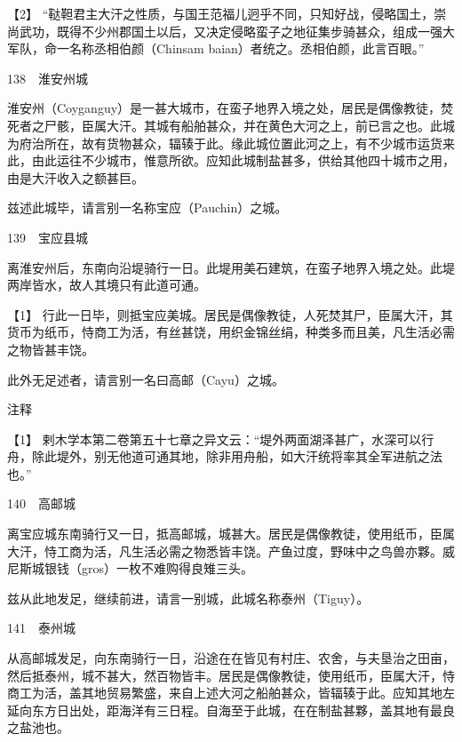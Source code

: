 \documentclass[12pt,UTF8]{ctexbook}
\begin{document}
【2】 “鞑靼君主大汗之性质，与国王范福儿迥乎不同，只知好战，侵略国土，崇尚武功，既得不少州郡国土以后，又决定侵略蛮子之地征集步骑甚众，组成一强大军队，命一名称丞相伯颜（Chinsam baian）者统之。丞相伯颜，此言百眼。”





138　淮安州城

淮安州（Coyganguy）是一甚大城市，在蛮子地界入境之处，居民是偶像教徒，焚死者之尸骸，臣属大汗。其城有船舶甚众，并在黄色大河之上，前已言之也。此城为府治所在，故有货物甚众，辐辏于此。缘此城位置此河之上，有不少城市运货来此，由此运往不少城市，惟意所欲。应知此城制盐甚多，供给其他四十城市之用，由是大汗收入之额甚巨。

兹述此城毕，请言别一名称宝应（Pauchin）之城。





139　宝应县城

离淮安州后，东南向沿堤骑行一日。此堤用美石建筑，在蛮子地界入境之处。此堤两岸皆水，故人其境只有此道可通。





【1】 行此一日毕，则抵宝应美城。居民是偶像教徒，人死焚其尸，臣属大汗，其货币为纸币，恃商工为活，有丝甚饶，用织金锦丝绢，种类多而且美，凡生活必需之物皆甚丰饶。

此外无足述者，请言别一名曰高邮（Cayu）之城。

注释

【1】 剌木学本第二卷第五十七章之异文云：“堤外两面湖泽甚广，水深可以行舟，除此堤外，别无他道可通其地，除非用舟船，如大汗统将率其全军进航之法也。”





140　高邮城

离宝应城东南骑行又一日，抵高邮城，城甚大。居民是偶像教徒，使用纸币，臣属大汗，恃工商为活，凡生活必需之物悉皆丰饶。产鱼过度，野味中之鸟兽亦夥。威尼斯城银钱（gros）一枚不难购得良雉三头。

兹从此地发足，继续前进，请言一别城，此城名称泰州（Tiguy）。





141　泰州城

从高邮城发足，向东南骑行一日，沿途在在皆见有村庄、农舍，与夫垦治之田亩，然后抵泰州，城不甚大，然百物皆丰。居民是偶像教徒，使用纸币，臣属大汗，恃商工为活，盖其地贸易繁盛，来自上述大河之船舶甚众，皆辐辏于此。应知其地左延向东方日出处，距海洋有三日程。自海至于此城，在在制盐甚夥，盖其地有最良之盐池也。
\end{document}
